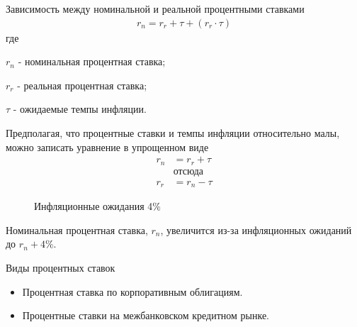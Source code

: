 \documentclass[_DKB_p1_Money.tex]{subfiles}
\begin{document}
\begin{frame}[allowframebreaks]{\setfontsize{12pt}Зависимость между номинальной и реальной процентными ставками }
\begin{align}
r_n=r_r+\tau+(r_r \cdot \tau)
\end{align}
где

$r_n$ - номинальная процентная ставка;

$r_r$ - реальная процентная ставка;

$\tau$ - ожидаемые темпы инфляции.

\pagebreak
Предполагая, что процентные ставки и темпы инфляции относительно малы, можно записать уравнение в упрощенном виде
\begin{align}
r_n&=r_r+\tau\\
&\text{отсюда} \nonumber\\
r_r&=r_n-\tau
\end{align}

\end{frame}

\begin{frame}
\begin{figure}
\center
	\begin{overprint}
\end{overprint}
\vspace*{-2em}
\caption{Инфляционные ожидания 4\%}
\end{figure}

Номинальная процентная ставка, $r_n$, увеличится из-за инфляционных ожиданий до $r_n + 4\%$.


\end{frame}

\begin{frame}{Виды процентных ставок}
\begin{itemize}
\item
Процентная ставка по корпоративным облигациям.
\item
Процентные ставки на межбанковском кредитном рынке.
\end{itemize}
\end{frame}
\end{document}
